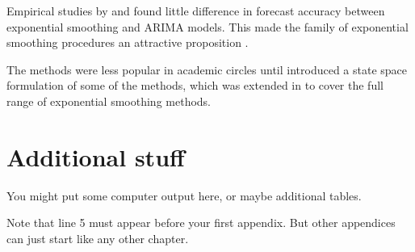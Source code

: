 \documentclass[doubleside,doublespace]{aucklandthesis}
\begin{document}
Empirical studies by \textcite{MH79} and \textcite{Metal82} found little difference in forecast accuracy between exponential smoothing and ARIMA models. This made the family of exponential smoothing procedures an attractive proposition \autocite[see][]{CKOS01}.

The methods were less popular in academic circles until \textcite{OKS97} introduced a state space formulation of some of the methods, which was extended in \textcite{HKSG02} to cover the full range of exponential smoothing methods.

\appendix

\hypertarget{additional-stuff}{%
\chapter{Additional stuff}\label{additional-stuff}}

You might put some computer output here, or maybe additional tables.

Note that line 5 must appear before your first appendix. But other appendices can just start like any other chapter.


\begingroup
{}
\printbibliography[heading=bibintoc]
\endgroup
\end{document}
